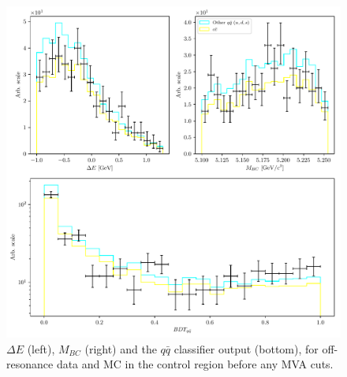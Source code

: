 \begin{figure}[H]
\centering
\captionsetup{width=0.8\linewidth}
\includegraphics[width=\linewidth]{fig/offres_control}
\caption{$\Delta E$ (left), $M_{BC}$ (right) and the $q \bar q$ classifier output (bottom), for off-resonance data and MC in the control region before any MVA cuts.}
\label{fig:offres_control}
\end{figure}

